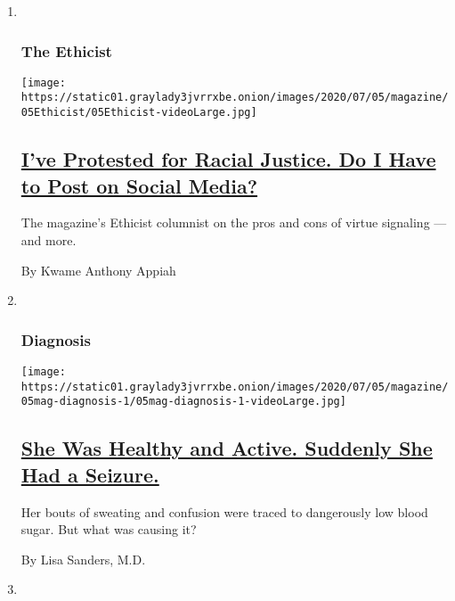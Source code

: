 \begin{enumerate}
\def\labelenumi{\arabic{enumi}.}
\item ~
  \hypertarget{the-ethicist}{%
  \subsubsection{The Ethicist}\label{the-ethicist}}

  \texttt{[image: https://static01.graylady3jvrrxbe.onion/images/2020/07/05/magazine/05Ethicist/05Ethicist-videoLarge.jpg]}

  \hypertarget{ive-protested-for-racial-justice-do-i-have-to-post-on-social-media}{%
  \subsection{\texorpdfstring{\href{/2020/06/30/magazine/ive-protested-for-racial-justice-do-i-have-to-post-on-social-media.html}{I've
  Protested for Racial Justice. Do I Have to Post on Social
  Media?}}{I've Protested for Racial Justice. Do I Have to Post on Social Media?}}\label{ive-protested-for-racial-justice-do-i-have-to-post-on-social-media}}

  The magazine's Ethicist columnist on the pros and cons of virtue
  signaling --- and more.

  By Kwame Anthony Appiah
\item ~
  \hypertarget{diagnosis}{%
  \subsubsection{Diagnosis}\label{diagnosis}}

  \texttt{[image: https://static01.graylady3jvrrxbe.onion/images/2020/07/05/magazine/05mag-diagnosis-1/05mag-diagnosis-1-videoLarge.jpg]}

  \hypertarget{she-was-healthy-and-active-suddenly-she-had-a-seizure}{%
  \subsection{\texorpdfstring{\href{/2020/07/01/magazine/insulinoma-diagnosis.html}{She
  Was Healthy and Active. Suddenly She Had a
  Seizure.}}{She Was Healthy and Active. Suddenly She Had a Seizure.}}\label{she-was-healthy-and-active-suddenly-she-had-a-seizure}}

  Her bouts of sweating and confusion were traced to dangerously low
  blood sugar. But what was causing it?

  By Lisa Sanders, M.D.
\item ~
  \hypertarget{screenland}{%
}
\end{enumerate}
